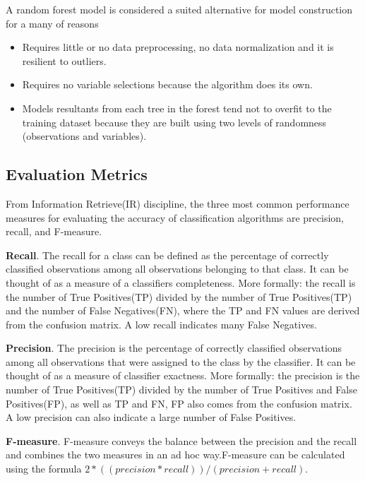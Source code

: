 \documentclass[10pt, conference]{IEEEtran}
\begin{document}
A random forest model is considered a suited alternative for model construction for a many of reasons\cite{Williams2011} 

\begin{itemize}
  \item Requires little or no data preprocessing, no data normalization and it is resilient to outliers.
  \item Requires no variable selections because the algorithm does its own.
  \item Models resultants from each tree in the forest tend not to overfit to the training dataset because they are built using two levels of randomness (observations and variables).
\end{itemize}


\subsection{Evaluation Metrics}
From Information Retrieve(IR) discipline, the three most common performance measures for evaluating the accuracy of classification algorithms are precision, recall, and F-measure\cite{Feldman2007}. 

\textbf{Recall}. The recall for a class can be defined as the percentage of correctly classified observations among all observations belonging to that class. It can be thought of as a measure of a classifiers completeness. More formally\cite{Facelli2015}: the recall is the number of True Positives(TP) divided by the number of True Positives(TP) and the number of False Negatives(FN), where the TP and FN values are derived from the confusion matrix. A low recall indicates many False Negatives\cite{Zhao2013}.

\textbf{Precision}. The precision is the percentage of correctly classified observations among all observations that were assigned to the class by the classifier. It can be thought of as a measure of classifier exactness. More formally\cite{Facelli2015}: the precision is the number of True Positives(TP) divided by the number of True Positives and False Positives(FP), as well as TP and FN, FP also comes from the confusion matrix. A low precision can also indicate a large number of False Positives\cite{Zhao2013}.

\textbf{F-measure}. F-measure conveys the balance between the precision and the recall and combines the two measures in an ad hoc way\cite{Feldman2007, Zhao2013}.F-measure can be calculated using the formula $2*((precision*recall))/(precision+recall)$. 
\end{document}
